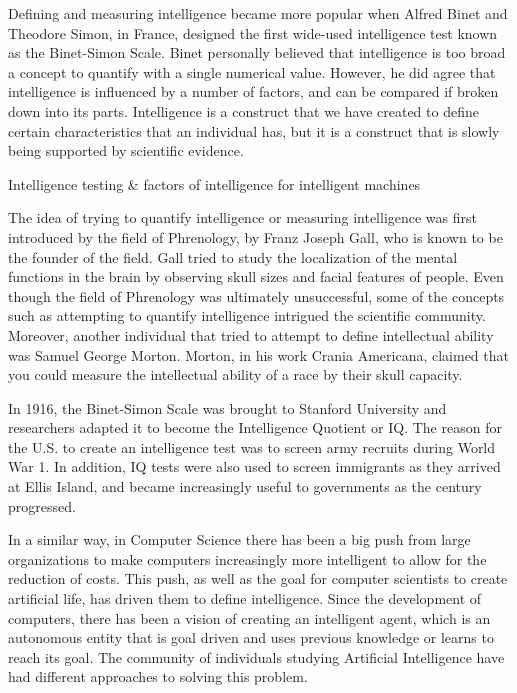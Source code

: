 \documentclass[11pt]{article}
\begin{document}
\par Defining and measuring intelligence became more popular when Alfred Binet and Theodore Simon, in France, designed the first wide-used intelligence test known as the Binet-Simon Scale. Binet personally believed that intelligence is too broad a concept to quantify with a single numerical value. However, he did agree that intelligence is influenced by a number of factors, and can be compared if broken down into its parts. Intelligence is a construct that we have created to define certain characteristics that an individual has, but it is a construct that is slowly being supported by scientific evidence.

\begin{center}
	{\large Intelligence testing \& factors of intelligence for intelligent machines\par}
\end{center}

\par The idea of trying to quantify intelligence or measuring intelligence was first introduced by the field of Phrenology, by Franz Joseph Gall, who is known to be the founder of the field. Gall tried to study the localization of the mental functions in the brain by observing skull sizes and facial features of people. Even though the field of Phrenology was ultimately unsuccessful, some of the concepts such as attempting to quantify intelligence intrigued the scientific community. Moreover, another individual that tried to attempt to define intellectual ability was Samuel George Morton. Morton, in his work Crania Americana, claimed that you could measure the intellectual ability of a race by their skull capacity. 

\par In 1916, the Binet-Simon Scale was brought to Stanford University and researchers adapted it to become the Intelligence Quotient or IQ. The reason for the U.S. to create an intelligence test was to screen army recruits during World War 1. In addition, IQ tests were also used to screen immigrants as they arrived at Ellis Island, and became increasingly useful to governments as the century progressed. 

\par In a similar way, in Computer Science there has been a big push from large organizations to make computers increasingly more intelligent to allow for the reduction of costs. This push, as well as the goal for computer scientists to create artificial life, has driven them to define intelligence. Since the development of computers, there has been a vision of creating an intelligent agent, which is an autonomous entity that is goal driven and uses previous knowledge or learns to reach its goal. The community of individuals studying Artificial Intelligence have had different approaches to solving this problem. 
\end{document}

